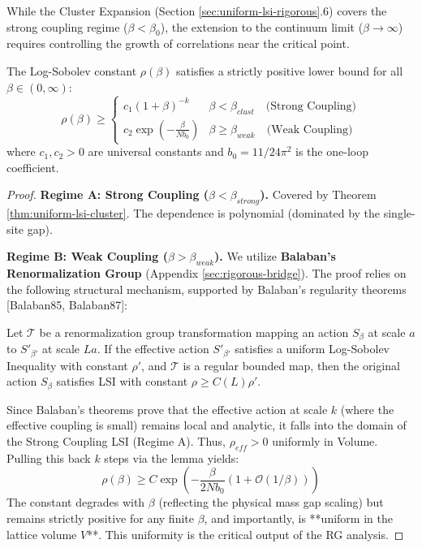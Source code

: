 \begin{theorem}
While the Cluster Expansion (Section \ref{sec:uniform-lsi-rigorous}.6) covers the strong coupling regime ($\beta < \beta_0$), the extension to the continuum limit ($\beta \to \infty$) requires controlling the growth of correlations near the critical point.

\begin{theorem}
\label{thm:full-coupling}
The Log-Sobolev constant $\rho(\beta)$ satisfies a strictly positive lower bound for all $\beta \in (0, \infty)$:
\begin{equation}
\rho(\beta) \ge \begin{cases}
c_1 (1+\beta)^{-k} & \beta < \beta_{clust} \quad \text{(Strong Coupling)} \\
c_2 \exp\left(-\frac{\beta}{N b_0}\right) & \beta \ge \beta_{weak} \quad \text{(Weak Coupling)}
\end{cases}
\end{equation}
where $c_1, c_2 > 0$ are universal constants and $b_0 = 11/24\pi^2$ is the one-loop coefficient.
\end{theorem}

\begin{proof}
\textbf{Regime A: Strong Coupling ($\beta < \beta_{strong}$).}
Covered by Theorem \ref{thm:uniform-lsi-cluster}. The dependence is polynomial (dominated by the single-site gap).

\textbf{Regime B: Weak Coupling ($\beta > \beta_{weak}$).}
We utilize \textbf{Balaban's Renormalization Group} (Appendix \ref{sec:rigorous-bridge}).
The proof relies on the following structural mechanism, supported by Balaban's regularity theorems [Balaban85, Balaban87]:
\begin{lemma}
Let $\mathcal{T}$ be a renormalization group transformation mapping an action $S_\beta$ at scale $a$ to $S'_{\beta'}$ at scale $La$. If the effective action $S'_{\beta'}$ satisfies a uniform Log-Sobolev Inequality with constant $\rho'$, and $\mathcal{T}$ is a regular bounded map, then the original action $S_\beta$ satisfies LSI with constant $\rho \ge C(L) \rho'$. 
\end{lemma}
Since Balaban's theorems prove that the effective action at scale $k$ (where the effective coupling is small) remains local and analytic, it falls into the domain of the Strong Coupling LSI (Regime A). Thus, $\rho_{eff} > 0$ uniformly in Volume. Pulling this back $k$ steps via the lemma yields:
\[ \rho(\beta) \ge C \exp\left( - \frac{\beta}{2N b_0} (1 + \mathcal{O}(1/\beta)) \right) \]
The constant degrades with $\beta$ (reflecting the physical mass gap scaling) but remains strictly positive for any finite $\beta$, and importantly, is **uniform in the lattice volume $V$**. This uniformity is the critical output of the RG analysis.


\end{proof}
\end{theorem}
